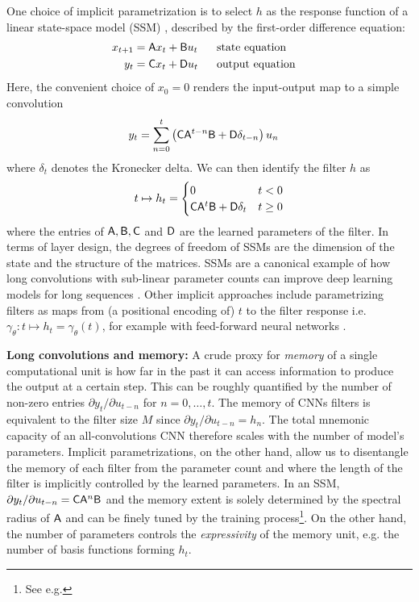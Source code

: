 One choice of implicit parametrization is to select $h$ as the response function of a linear state-space model (SSM) \citep{chen1984linear}, described by the first-order difference equation:
%
\begin{equation*}%
    \begin{aligned}
        x_{t+1} &= \sA x_t + \sB u_t &&~~ \text{state equation} & \\
        y_t &= \sC x_t + \sD u_t &&~~ \text{output equation} &
    \end{aligned}
\end{equation*}
%
Here, the convenient choice of $x_0 = 0$ renders the input-output map to a simple convolution
%
\[
    \begin{aligned}
        y_t & =\sum_{n=0}^{t}\left(\mathsf{C}\mathsf{A}^{t - n}\mathsf{B} + \mathsf{D} \delta_{t-n}\right)u_n 
    \end{aligned}
\]
%
where $\delta_t$ denotes the Kronecker delta. We can then identify the filter $h$ as
%
\[
    t\mapsto h_t =
    \begin{cases}
        0 & t<0\\
        \mathsf{C} \mathsf{A}^t \mathsf{B} + \mathsf{D}\delta_t & t\geq 0
    \end{cases}
\]
%
where the entries of $\mathsf{A}, \mathsf{B}, \mathsf{C}$ and $\mathsf{D}$ are the learned parameters of the filter. In terms of layer design, the degrees of freedom of SSMs are the dimension of the state and the structure of the matrices. 
SSMs are a canonical example of how long convolutions with sub-linear parameter counts can improve deep learning models for long sequences \citep{gu2020hippo,gu2021efficiently}.
%
 Other implicit approaches include parametrizing filters as maps from (a positional encoding of) $t$ to the filter response i.e.  $\gamma_\theta : t \mapsto h_t=\gamma_\theta(t)$, for example with feed-forward neural networks \citep{romero2021ckconv,romero2021flexconv}. 
%
\begin{tcolorbox}[enhanced, drop fuzzy shadow, frame hidden, sharp corners, breakable, colback=blue!5] \textbf{Long convolutions and memory:} A crude proxy for \textit{memory} of a single computational unit is how far in the past it can access information to produce the output at a certain step. This can be roughly quantified by the number of non-zero entries $\partial y_t / \partial u_{t-n}$ for $n = 0, \ldots, t$. The memory of CNNs filters is equivalent to the filter size $M$ since $\partial y_t / \partial u_{t-n} = h_{n}$. The total mnemonic capacity of an all-convolutions CNN therefore scales with the number of model's parameters. Implicit parametrizations, on the other hand, allow us to disentangle the memory of each filter from the parameter count and where the length of the filter is implicitly controlled by the learned parameters. In an SSM, $\partial y_t / \partial u_{t-n} = \mathsf{C} \mathsf{A}^n \mathsf{B}$ and the memory extent is solely determined by the spectral radius of $\mathsf{A}$ and can be finely tuned by the training process\footnote{See e.g.\cite{gu2020hippo,gu2021efficiently}}. On the other hand, the number of parameters controls the \textit{expressivity} of the memory unit, e.g. the number of basis functions forming $h_t$. 
\end{tcolorbox}
%
